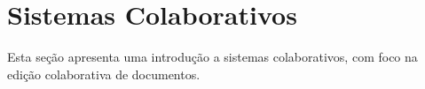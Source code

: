 \section{Sistemas Colaborativos}\label{2-fundamentacao-sistemas-colaborativos}

Esta seção apresenta uma introdução a sistemas colaborativos, com foco na edição colaborativa de documentos.




%
%